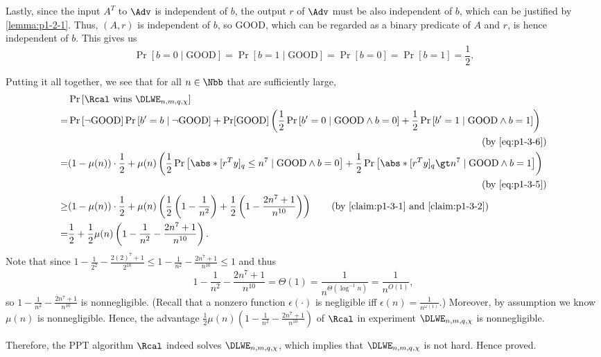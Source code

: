 \begin{answer}[iii]
    Lastly, since the input $A^T$ to $\Adv$ is independent of $b$, the output $r$ of $\Adv$ must be also independent of $b$, which can be justified by \autoref{lemma:p1-2-1}. Thus, $(A, r)$ is independent of $b$, so $\textrm{GOOD}$, which can be regarded as a binary predicate of $A$ and $r$, is hence independent of $b$. This gives us
    \begin{equation}\label{eq:p1-3-6}
        \Pr[b=0 \mid \textrm{GOOD}]=\Pr[b=1 \mid \textrm{GOOD}]
        = \Pr[b=0] =\Pr[b=1] =\frac{1}{2}.
    \end{equation}

    Putting it all together, we see that for all $n\in\Nbb$ that are sufficiently large,
    \begin{align*}
        &\Pr\left[\Rcal \textrm{ wins }  \DLWE_{n,m,q,\chi}\right]\\
        =& \Pr\left[\neg \textrm{GOOD}\right]\Pr\left[b'=b \mid \neg \textrm{GOOD}\right]
        + \Pr[\textrm{GOOD}]\left(\frac{1}{2}\Pr\left[b'=0 \mid \textrm{GOOD}\land b=0\right]+\frac{1}{2}\Pr\left[b'=1 \mid \textrm{GOOD}\land b=1\right] \right)\\
        &\hspace{15cm} (\textrm{by \eqref{eq:p1-3-6}})\\
        =& (1-\mu(n))\cdot \frac{1}{2}+\mu(n)\left(\frac{1}{2}\Pr\left[\abs*{[r^Ty]_q}\le n^7 \mid \textrm{GOOD}\land b=0\right]+\frac{1}{2}\Pr\left[\abs*{[r^Ty]_q}\gt n^7 \mid \textrm{GOOD}\land b=1\right]\right)\\
        &\hspace{15cm} (\textrm{by \eqref{eq:p1-3-5}})\\
        \ge&  (1-\mu(n))\cdot \frac{1}{2}+\mu(n)\left(\frac{1}{2}\left(1- \frac{1}{n^2}\right)+\frac{1}{2}\left(1-\frac{2n^7+1}{n^{10}}\right)\right)
        \qquad (\textrm{by \autoref{claim:p1-3-1} and \autoref{claim:p1-3-2}}) \\
        =& \frac{1}{2}+\frac{1}{2}\mu(n)\left(1- \frac{1}{n^2}-\frac{2n^7+1}{n^{10}}\right).
    \end{align*}
    Note that since $1-\frac{1}{2^2}-\frac{2(2)^7+1}{2^{10}}\le 1- \frac{1}{n^2}-\frac{2n^7+1}{n^{10}}\le 1$ and thus
    \[
        1- \frac{1}{n^2}-\frac{2n^7+1}{n^{10}}
        =\Theta(1)=\frac{1}{n^{\Theta(\log^{-1} n)}}=\frac{1}{n^{O(1)}},
    \]
    so $1- \frac{1}{n^2}-\frac{2n^7+1}{n^{10}}$ is nonnegligible. (Recall that a nonzero function $\epsilon(\cdot)$ is negligible iff $\epsilon(n)=\frac{1}{n^{\omega(1)}}$.)
    Moreover, by assumption we know $\mu(n)$ is nonnegligible. Hence, the advantage $\frac{1}{2}\mu(n)\left(1- \frac{1}{n^2}-\frac{2n^7+1}{n^{10}}\right)$ of $\Rcal$ in experiment $\DLWE_{n,m,q,\chi}$ is nonnegligible.

    Therefore, the PPT algorithm $\Rcal$ indeed solves $\DLWE_{n,m,q,\chi}$, which implies that $\DLWE_{n,m,q,\chi}$ is not hard. Hence proved.
\end{answer}